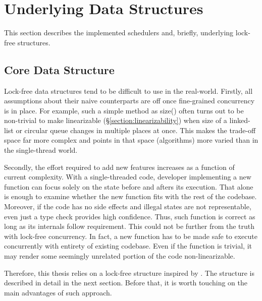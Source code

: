 \documentclass[12pt,a4paper,twoside]{report}
\begin{document}
\section{Underlying Data Structures}

This section describes the implemented schedulers and, briefly, underlying lock-free structures. 

\subsection{Core Data Structure}

Lock-free data structures tend to be difficult to use in the real-world. Firstly, all assumptions about their naive counterparts are off once fine-grained concurrency is in place. For example, such a simple method as size() often turns out to be non-trivial to make linearizable (\S\ref{section:linearizability}) when size of a linked-list or circular queue changes in multiple places at once. This makes the trade-off space far more complex and points in that space (algorithms) more varied than in the single-thread world.

Secondly, the effort required to add new features increases as a function of current complexity. With a single-threaded code, developer implementing a new function can focus solely on the state before and afters its execution. That alone is enough to examine whether the new function fits with the rest of the codebase. Moreover, if the code has no side effects and illegal states are not representable, even just a type check provides high confidence. Thus, such function is correct as long as its internals follow requirement. This could not be further from the truth with lock-free concurrency. In fact, a new function has to be made safe to execute concurrently with entirety of existing codebase. Even if the function is trivial, it may render some seemingly unrelated portion of the code non-linearizable. 

Therefore, this thesis relies on a lock-free structure inspired by \citet{Kappes2021}. The structure is described in detail in the next section. Before that, it is worth touching on the main advantages of such approach. 
\end{document}

